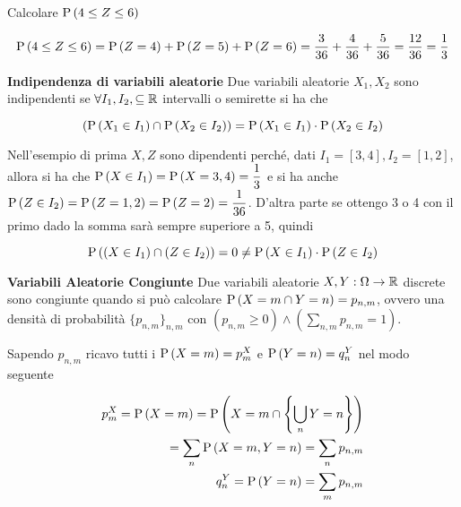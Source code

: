 \begin{exmp}
    Calcolare $ \text{P}\left(4 \leq Z \leq 6\right) $
    
    \begin{equation*}
    \text{P}\left(4 \leq Z \leq 6\right) = \text{P}\left(Z = 4\right) + \text{P}\left(Z = 5\right) + \text{P}\left(Z = 6\right) = \dfrac{3}{36} + \dfrac{4}{36} + \dfrac{5}{36} = \dfrac{12}{36} = \dfrac{1}{3}
    \end{equation*}
\end{exmp}		


\begin{defn}
    \textbf{Indipendenza di variabili aleatorie}
    Due variabili aleatorie $ X_1, X_2 $ sono indipendenti se $ \forall I_1, I_2, \subseteq \mathbb{R} $ intervalli o semirette si ha che 
    
    \begin{equation*}
        \left( \text{P}\left(X_1 \in I_1\right) \cap \text{P}\left(X_2 \in I_2\right) \right) = \text{P}\left(X_1 \in I_1\right) \cdot \text{P}\left(X_2 \in I_2\right)
    \end{equation*}
\end{defn}
    
    Nell'esempio di prima $ X, Z $  sono dipendenti perch\'e, dati $ I_1 = [3,4], I_2 = [1,2] $, allora si ha che $ \text{P}\left(X\in I_1\right) = \text{P}\left(X=3,4\right) = \dfrac{1}{3} $ e si ha anche $ \text{P}\left(Z \in I_2\right) = \text{P}\left(Z=1,2\right) = \text{P}\left(Z=2\right) = \dfrac{1}{36} $. D'altra parte se ottengo 3 o 4 con il primo dado la somma sar\`a sempre superiore a 5, quindi

    \begin{equation*}
    \text{P}\left((X \in I_1) \cap (Z\in I_2)\right) =0\neq  \text{P}\left(X \in I_1\right) \cdot \text{P}\left(Z \in I_2\right)
    \end{equation*}



\begin{defn}
    \textbf{Variabili Aleatorie Congiunte}
    Due variabili aleatorie $ X,Y : \Omega \to \mathbb{R} $ discrete sono congiunte quando si pu\`o  calcolare $ \text{P}\left(X = m \cap Y = n\right) = p_{n,m} $, ovvero una densit\`a  di probabilit\`a  $ \{ p_{n,m} \}_{n,m} $ con $ (p_{n,m} \geq 0 ) \land (\sum_{n,m} p_{n,m} = 1) $.
\end{defn}

Sapendo $ p_{n,m} $ ricavo tutti i $ \text{P}\left(X=m\right) = p^X_m $ e $ \text{P}\left(Y = n\right) = q^Y_n $ nel modo seguente

\begin{equation*}
    \begin{aligned}
    p^X_m =\text{P}\left(X=m\right) = \text{P}\left(X = m \cap \left\{ \bigcup_{n} Y=n \right\}\right) \\
    = \sum_{n} \text{P}\left(X=m,Y=n\right) = \sum_n p_{n,m}\\
    q^Y_n=\text{P}\left(Y=n\right) = \sum_{m} p_{n,m}
    \end{aligned}
\end{equation*}
    

